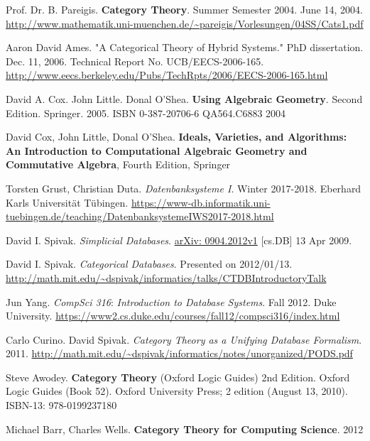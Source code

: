 \documentclass[10pt]{amsart}
\begin{document}
\begin{thebibliography}{9}
Prof. Dr. B. Pareigis. \textbf{Category Theory}. Summer Semester 2004. June 14, 2004. \url{http://www.mathematik.uni-muenchen.de/~pareigis/Vorlesungen/04SS/Cats1.pdf}


Aaron David Ames. "A Categorical Theory of Hybrid Systems." PhD dissertation. Dec. 11, 2006. Technical Report No. UCB/EECS-2006-165. \url{http://www.eecs.berkeley.edu/Pubs/TechRpts/2006/EECS-2006-165.html}


David A. Cox.  John Little. Donal O'Shea. \textbf{Using Algebraic Geometry}.  Second Edition.  Springer.  2005.  ISBN 0-387-20706-6 QA564.C6883 2004

David Cox, John Little, Donal O'Shea. \textbf{Ideals, Varieties, and Algorithms: An Introduction to Computational Algebraic Geometry and Commutative Algebra}, Fourth Edition, Springer

Torsten Grust, Christian Duta. \emph{Datenbanksysteme I}. Winter 2017-2018. Eberhard Karls Universit\"{a}t T\"{u}bingen.  \url{https://www-db.informatik.uni-tuebingen.de/teaching/DatenbanksystemeIWS2017-2018.html}


David I. Spivak. \emph{Simplicial Databases}. \href{https://arxiv.org/abs/0904.2012}{arXiv: 0904.2012v1} [cs.DB] 13 Apr 2009.

David I. Spivak. \emph{Categorical Databases}. Presented on 2012/01/13. \url{http://math.mit.edu/~dspivak/informatics/talks/CTDBIntroductoryTalk}

Jun Yang. \emph{CompSci 316}: \emph{Introduction to Database Systems}. Fall 2012. Duke University. \url{https://www2.cs.duke.edu/courses/fall12/compsci316/index.html}

Carlo Curino. David Spivak. \emph{Category Theory as a Unifying Database Formalism}. 2011. \url{http://math.mit.edu/~dspivak/informatics/notes/unorganized/PODS.pdf}

Steve Awodey. \textbf{Category Theory} (Oxford Logic Guides) 2nd Edition. Oxford Logic Guides (Book 52). Oxford University Press; 2 edition (August 13, 2010). ISBN-13: 978-0199237180

Michael Barr, Charles Wells. \textbf{Category Theory for Computing Science}. 2012


\end{thebibliography}
\end{document}
